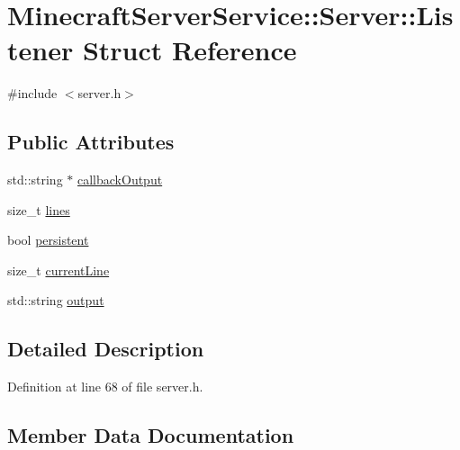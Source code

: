 \hypertarget{struct_minecraft_server_service_1_1_server_1_1_listener}{}\section{Minecraft\+Server\+Service\+:\+:Server\+:\+:Listener Struct Reference}
\label{struct_minecraft_server_service_1_1_server_1_1_listener}


{\ttfamily \#include $<$server.\+h$>$}

\subsection*{Public Attributes}
\begin{DoxyCompactItemize}
\item 
std\+::string $\ast$ \hyperlink{struct_minecraft_server_service_1_1_server_1_1_listener_afe51cb4015caab08814ce3bd0a3ec82a}{callback\+Output}
\item 
size\+\_\+t \hyperlink{struct_minecraft_server_service_1_1_server_1_1_listener_a5a853e93216533fd712c340a1a205bd6}{lines}
\item 
bool \hyperlink{struct_minecraft_server_service_1_1_server_1_1_listener_a5c2d263cbd47b373785c121fa90e8018}{persistent}
\item 
size\+\_\+t \hyperlink{struct_minecraft_server_service_1_1_server_1_1_listener_a9a92bb07a6417a09094c7495f5fa6c84}{current\+Line}
\item 
std\+::string \hyperlink{struct_minecraft_server_service_1_1_server_1_1_listener_a556f64e2111a3ba08538fda0ec9e63f9}{output}
\end{DoxyCompactItemize}


\subsection{Detailed Description}


Definition at line 68 of file server.\+h.



\subsection{Member Data Documentation}
